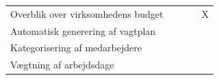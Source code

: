 \begin{table}[h]
\begin{tabular}{@{}lcccc@{}}
\multicolumn{1}{l|}{Overblik over virksomhedens budget}          &                                     &                                      &                                       & X                                     \\
\multicolumn{1}{l|}{Automatisk generering af vagtplan}           & \multicolumn{1}{l}{}                & \multicolumn{1}{l}{}                 & \multicolumn{1}{l}{}                  & \multicolumn{1}{l}{}                  \\
\multicolumn{1}{l|}{Kategorisering af medarbejdere}              & \multicolumn{1}{l}{}                & \multicolumn{1}{l}{}                 & \multicolumn{1}{l}{}                  & \multicolumn{1}{l}{}                  \\
\multicolumn{1}{l|}{Vægtning af arbejdsdage}                                          & \multicolumn{1}{l}{}                & \multicolumn{1}{l}{}                 & \multicolumn{1}{l}{}                  & \multicolumn{1}{l}{}                  \\ \bottomrule
\end{tabular}
\end{table}




